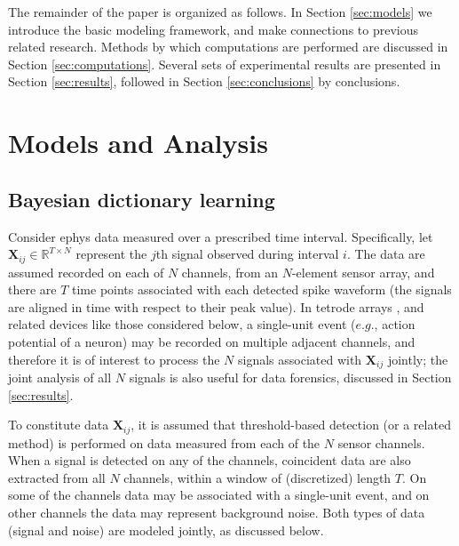 \documentclass[journal]{IEEEtran}
\def\bf{\mathbf}
\newcommand{\Xmat}{{\bf X}}
\begin{document}
The remainder of the paper is organized as follows. In Section \ref{sec:models} we introduce the basic modeling framework, and make connections to previous related research. Methods by which computations are performed are discussed in Section \ref{sec:computations}.
Several sets of experimental results are presented in Section \ref{sec:results}, followed in Section \ref{sec:conclusions} by conclusions.

\section{Models and Analysis\label{sec:models}}

\subsection{Bayesian dictionary learning\label{sec:dict}}

Consider ephys data measured over a prescribed time interval. Specifically, let $\Xmat_{ij}\in\mathbb{R}^{T\times N}$ represent the $j$th signal observed during interval $i$. The data are assumed recorded on each of $N$ channels, from an $N$-element sensor array, and there are $T$ time points associated with each detected spike waveform (the signals are aligned in time with respect to their peak value). In tetrode arrays \cite{tetrode}, and related devices like those considered below, a single-unit event ($e.g.$, action potential of a neuron) may be recorded on multiple adjacent channels, and therefore it is of interest to process the $N$ signals associated with $\Xmat_{ij}$ jointly; the joint analysis of all $N$ signals is also useful for data forensics, discussed in Section \ref{sec:results}.

To constitute data $\Xmat_{ij}$, it is assumed that threshold-based detection (or a related method) is performed on data measured from each of the $N$ sensor channels. When a signal is detected on any of the channels, coincident data are also extracted from all $N$ channels, within a window of (discretized) length $T$. On some of the channels data may be associated with a single-unit event, and on other channels the data may represent background noise. Both types of data (signal and noise) are modeled jointly, as discussed below.
\end{document}
